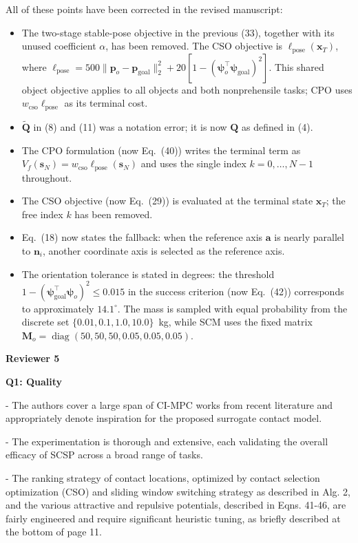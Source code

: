 \documentclass[journal,10pt]{IEEEtran}
\newcommand{\reviewer}[1]{\par\smallskip\noindent
 \textcolor{responseblue}{\textbf{#1\hspace{0.2em}}}}
\newcommand{\question}[2]{\par\smallskip\noindent
 \color{responseblue}\textbf{Q#1: #2}\par\nobreak\noindent\color{responseblue}}
\begin{document}
All of these points have been corrected in the revised manuscript:
\begin{itemize}
 \item The two-stage stable-pose objective in the previous (33), together with its unused coefficient $\alpha$, has been removed. The CSO objective is $\ell_{\mathrm{pose}}(\boldsymbol{x}_T)$, where $\ell_{\mathrm{pose}}=500\|\boldsymbol{p}_o-\boldsymbol{p}_{\mathrm{goal}}\|_2^2+20[1-(\boldsymbol{\psi}_o^\top\boldsymbol{\psi}_{\mathrm{goal}})^2]$. This shared object objective applies to all objects and both nonprehensile tasks; CPO uses $w_{\mathrm{cso}}\ell_{\mathrm{pose}}$ as its terminal cost.
 \item $\tilde{\boldsymbol{Q}}$ in (8) and (11) was a notation error; it is now $\boldsymbol{Q}$ as defined in (4).
 \item The CPO formulation (now Eq.~(40)) writes the terminal term as $V_f(\boldsymbol{s}_N)=w_{\mathrm{cso}}\ell_{\mathrm{pose}}(\boldsymbol{s}_N)$ and uses the single index $k=0,\dots,N-1$ throughout.
 \item The CSO objective (now Eq.~(29)) is evaluated at the terminal state $\boldsymbol{x}_T$; the free index $k$ has been removed.
 \item Eq.~(18) now states the fallback: when the reference axis $\boldsymbol{a}$ is nearly parallel to $\boldsymbol{n}_i$, another coordinate axis is selected as the reference axis.
 \item The orientation tolerance is stated in degrees: the threshold $1-(\boldsymbol{\psi}_{\mathrm{goal}}^\top\boldsymbol{\psi}_o)^2\leq0.015$ in the success criterion (now Eq.~(42)) corresponds to approximately $14.1^\circ$. The mass is sampled with equal probability from the discrete set $\{0.01,0.1,1.0,10.0\}$~kg, while SCM uses the fixed matrix $\boldsymbol{M}_o=\operatorname{diag}(50,50,50,0.05,0.05,0.05)$.
\end{itemize}

\reviewer{Reviewer 5}

\question{1}{Quality}

- The authors cover a large span of CI-MPC works from recent literature
and appropriately denote inspiration for the proposed surrogate contact
model.

- The experimentation is thorough and extensive, each validating the
overall efficacy of SCSP across a broad range of tasks.

- The ranking strategy of contact locations, optimized by contact
selection optimization (CSO) and sliding window switching strategy as
described in Alg. 2, and the various attractive and repulsive
potentials, described in Eqns. 41-46, are fairly engineered and require
significant heuristic tuning, as briefly described at the bottom of
page 11.
\end{document}
